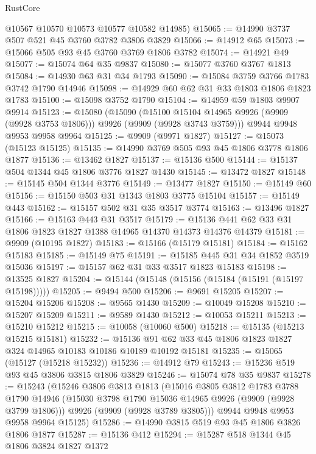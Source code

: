 \begin{lexlean}{RustCore}
\begin{coremodule}
      @10567
      @10570
      @10573
      @10577
      @10582
      @14985)
@15065 := @14990 @3737 @507 @521 @45 @3760 @3782 @3806 @3829
@15066 := @14912 @65
@15073 := @15066 @505 @93 @45 @3760 @3769 @1806 @3782
@15074 := @14921 @49
@15077 := @15074 @64 @35 @9837
@15080 := @15077 @3760 @3767 @1813
@15084 := @14930 @63 @31 @34 @1793
@15090 := @15084 @3759 @3766 @1783 @3742 @1790 @14946
@15098 := @14929 @60 @62 @31 @33 @1803 @1806 @1823 @1783
@15100 := @15098 @3752 @1790
@15104 := @14959 @59 @1803 @9907 @9914
@15123 := @15080
    (@15090
      (@15100 @15104 @14965 @9926 (@9909 (@9928 @3753 @1806)))
      @9926
      (@9909 (@9928 @3743 @3759)))
    @9944
    @9948
    @9953
    @9958
    @9964
@15125 := @9909 (@9971 @1827)
@15127 := @15073 (@15123 @15125)
@15135 := @14990 @3769 @505 @93 @45 @1806 @3778 @1806 @1877
@15136 := @13462 @1827
@15137 := @15136 @500
@15144 := @15137 @504 @1344 @45 @1806 @3776 @1827 @1430
@15145 := @13472 @1827
@15148 := @15145 @504 @1344 @3776
@15149 := @13477 @1827
@15150 := @15149 @60
@15156 := @15150 @503 @31 @1343 @1803 @3775 @15104
@15157 := @15149 @443
@15162 := @15157 @502 @31 @35 @3517 @3774
@15163 := @13496 @1827
@15166 := @15163 @443 @31 @3517
@15179 := @15136 @441 @62 @33 @31 @1806 @1823 @1827 @1388 @14965 @14370 @14373 @14376 @14379
@15181 := @9909 (@10195 @1827)
@15183 := @15166 (@15179 @15181)
@15184 := @15162 @15183
@15185 := @15149 @75
@15191 := @15185 @445 @31 @34 @1852 @3519 @15036
@15197 := @15157 @62 @31 @33 @3517 @1823 @15183
@15198 := @13525 @1827
@15204 := @15144 (@15148 (@15156 (@15184 (@15191 (@15197 @15198)))))
@15205 := @9494 @500
@15206 := @9691 @15205
@15207 := @15204 @15206
@15208 := @9565 @1430
@15209 := @10049 @15208
@15210 := @15207 @15209
@15211 := @9589 @1430
@15212 := @10053 @15211
@15213 := @15210 @15212
@15215 := @10058 (@10060 @500)
@15218 := @15135 (@15213 @15215 @15181)
@15232 := @15136 @91 @62 @33 @45 @1806 @1823 @1827 @324 @14965 @10183 @10186 @10189 @10192 @15181
@15235 := @15065 (@15127 (@15218 @15232))
@15236 := @14912 @79
@15243 := @15236 @519 @93 @45 @3806 @3815 @1806 @3829
@15246 := @15074 @78 @35 @9837
@15278 := @15243
    (@15246
      @3806
      @3813
      @1813
      (@15016
        @3805
        @3812
        @1783
        @3788
        @1790
        @14946
        (@15030 @3798 @1790 @15036 @14965 @9926 (@9909 (@9928 @3799 @1806)))
        @9926
        (@9909 (@9928 @3789 @3805)))
      @9944
      @9948
      @9953
      @9958
      @9964
      @15125)
@15286 := @14990 @3815 @519 @93 @45 @1806 @3826 @1806 @1877
@15287 := @15136 @412
@15294 := @15287 @518 @1344 @45 @1806 @3824 @1827 @1372

\end{coremodule}
\end{lexlean}
